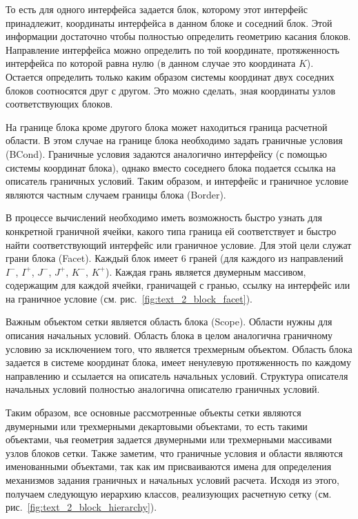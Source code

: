 То есть для одного интерфейса задается блок, которому этот интерфейс принадлежит, координаты интерфейса в данном блоке и соседний блок.
Этой информации достаточно чтобы полностью определить геометрию касания блоков.
Направление интерфейса можно определить по той координате, протяженность интерфейса по которой равна нулю (в данном случае это координата $K$).
Остается определить только каким образом системы координат двух соседних блоков соотносятся друг с другом.
Это можно сделать, зная координаты узлов соответствующих блоков.

На границе блока кроме другого блока может находиться граница расчетной области.
В этом случае на границе блока необходимо задать граничные условия (BCond).
Граничные условия задаются аналогично интерфейсу (с помощью системы координат блока), однако вместо соседнего блока подается ссылка на описатель граничных условий.
Таким образом, и интерфейс и граничное условие являются частным случаем границы блока (Border).

В процессе вычислений необходимо иметь возможность быстро узнать для конкретной граничной ячейки, какого типа граница ей соответствует и быстро найти соответствующий интерфейс или граничное условие.
Для этой цели служат грани блока (Facet).
Каждый блок имеет 6 граней (для каждого из направлений $I^{-}$, $I^{+}$, $J^{-}$, $J^{+}$, $K^{-}$, $K^{+}$).
Каждая грань является двумерным массивом, содержащим для каждой ячейки, граничащей с гранью, ссылку на интерфейс или на граничное условие (см. рис.~\ref{fig:text_2_block_facet}).

Важным объектом сетки является область блока (Scope).
Области нужны для описания начальных условий.
Область блока в целом аналогична граничному условию за исключением того, что является трехмерным объектом.
Область блока задается в системе координат блока, имеет ненулевую протяженность по каждому направлению и ссылается на описатель начальных условий.
Структура описателя начальных условий полностью аналогична описателю граничных условий.

Таким образом, все основные рассмотренные объекты сетки являются двумерными или трехмерными декартовыми объектами, то есть такими объектами, чья геометрия задается двумерными или трехмерными массивами узлов блоков сетки.
Также заметим, что граничные условия и области являются именованными объектами, так как им присваиваются имена для определения механизмов задания граничных и начальных условий расчета.
Исходя из этого, получаем следующую иерархию классов, реализующих расчетную сетку (см. рис.~\ref{fig:text_2_block_hierarchy}).

